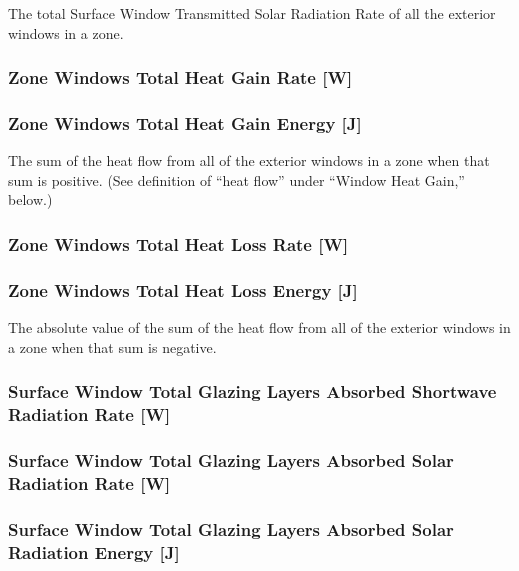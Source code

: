 The total Surface Window Transmitted Solar Radiation Rate of all the exterior windows in a zone.

\subsubsection{Zone Windows Total Heat Gain Rate {[}W{]}}\label{zone-windows-total-heat-gain-rate-w}

\subsubsection{Zone Windows Total Heat Gain Energy {[}J{]}}\label{zone-windows-total-heat-gain-energy-j}

The sum of the heat flow from all of the exterior windows in a zone when that sum is positive. (See definition of ``heat flow'' under ``Window Heat Gain,'' below.)

\subsubsection{Zone Windows Total Heat Loss Rate {[}W{]}}\label{zone-windows-total-heat-loss-rate-w}

\subsubsection{Zone Windows Total Heat Loss Energy {[}J{]}}\label{zone-windows-total-heat-loss-energy-j}

The absolute value of the sum of the heat flow from all of the exterior windows in a zone when that sum is negative.

\subsubsection{Surface Window Total Glazing Layers Absorbed Shortwave Radiation Rate {[}W{]}}\label{surface-window-total-glazing-layers-absorbed-shortwave-radiation-rate-w}

\subsubsection{Surface Window Total Glazing Layers Absorbed Solar Radiation Rate {[}W{]}}\label{surface-window-total-glazing-layers-absorbed-solar-radiation-rate-w}

\subsubsection{Surface Window Total Glazing Layers Absorbed Solar Radiation Energy {[}J{]}}\label{surface-window-total-glazing-layers-absorbed-solar-radiation-energy-j}

